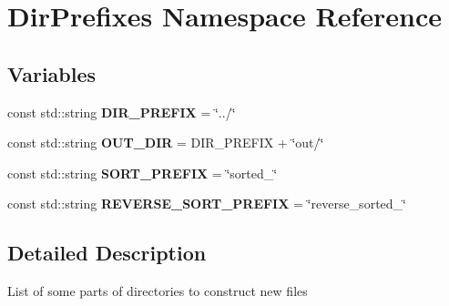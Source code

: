 \hypertarget{namespace_dir_prefixes}{}\section{Dir\+Prefixes Namespace Reference}
\label{namespace_dir_prefixes}
\subsection*{Variables}
\begin{DoxyCompactItemize}
\item 
\mbox{\label{namespace_dir_prefixes_a9a4ba489922044d5958f0068182679cf}} 
const std\+::string {\bfseries D\+I\+R\+\_\+\+P\+R\+E\+F\+IX} = \char`\"{}../\char`\"{}
\item 
\mbox{\label{namespace_dir_prefixes_a0b52703b09b89db9e1a6f1f3902bed1f}} 
const std\+::string {\bfseries O\+U\+T\+\_\+\+D\+IR} = D\+I\+R\+\_\+\+P\+R\+E\+F\+IX + \char`\"{}out/\char`\"{}
\item 
\mbox{\label{namespace_dir_prefixes_a9736bba31f32018ed82c46f6d4dd5b72}} 
const std\+::string {\bfseries S\+O\+R\+T\+\_\+\+P\+R\+E\+F\+IX} = \char`\"{}sorted\+\_\+\char`\"{}
\item 
\mbox{\label{namespace_dir_prefixes_ad748041f9ae71019098b122aadce1244}} 
const std\+::string {\bfseries R\+E\+V\+E\+R\+S\+E\+\_\+\+S\+O\+R\+T\+\_\+\+P\+R\+E\+F\+IX} = \char`\"{}reverse\+\_\+sorted\+\_\+\char`\"{}
\end{DoxyCompactItemize}


\subsection{Detailed Description}
List of some parts of directories to construct new files 